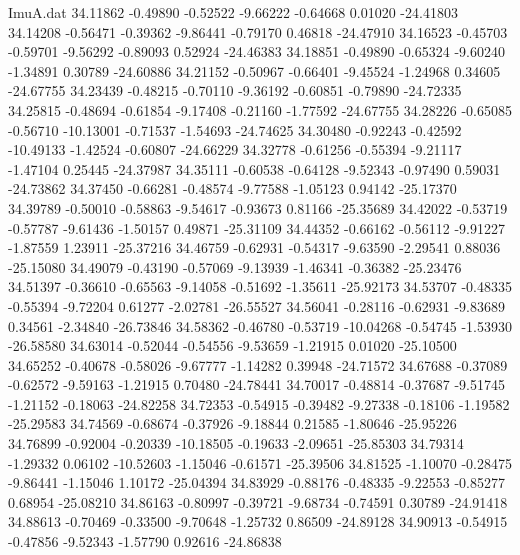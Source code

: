 \begin{filecontents}{ImuA.dat}
  34.11862   -0.49890   -0.52522   -9.66222   -0.64668    0.01020  -24.41803
  34.14208   -0.56471   -0.39362   -9.86441   -0.79170    0.46818  -24.47910
  34.16523   -0.45703   -0.59701   -9.56292   -0.89093    0.52924  -24.46383
  34.18851   -0.49890   -0.65324   -9.60240   -1.34891    0.30789  -24.60886
  34.21152   -0.50967   -0.66401   -9.45524   -1.24968    0.34605  -24.67755
  34.23439   -0.48215   -0.70110   -9.36192   -0.60851   -0.79890  -24.72335
  34.25815   -0.48694   -0.61854   -9.17408   -0.21160   -1.77592  -24.67755
  34.28226   -0.65085   -0.56710  -10.13001   -0.71537   -1.54693  -24.74625
  34.30480   -0.92243   -0.42592  -10.49133   -1.42524   -0.60807  -24.66229
  34.32778   -0.61256   -0.55394   -9.21117   -1.47104    0.25445  -24.37987
  34.35111   -0.60538   -0.64128   -9.52343   -0.97490    0.59031  -24.73862
  34.37450   -0.66281   -0.48574   -9.77588   -1.05123    0.94142  -25.17370
  34.39789   -0.50010   -0.58863   -9.54617   -0.93673    0.81166  -25.35689
  34.42022   -0.53719   -0.57787   -9.61436   -1.50157    0.49871  -25.31109
  34.44352   -0.66162   -0.56112   -9.91227   -1.87559    1.23911  -25.37216
  34.46759   -0.62931   -0.54317   -9.63590   -2.29541    0.88036  -25.15080
  34.49079   -0.43190   -0.57069   -9.13939   -1.46341   -0.36382  -25.23476
  34.51397   -0.36610   -0.65563   -9.14058   -0.51692   -1.35611  -25.92173
  34.53707   -0.48335   -0.55394   -9.72204    0.61277   -2.02781  -26.55527
  34.56041   -0.28116   -0.62931   -9.83689    0.34561   -2.34840  -26.73846
  34.58362   -0.46780   -0.53719  -10.04268   -0.54745   -1.53930  -26.58580
  34.63014   -0.52044   -0.54556   -9.53659   -1.21915    0.01020  -25.10500
  34.65252   -0.40678   -0.58026   -9.67777   -1.14282    0.39948  -24.71572
  34.67688   -0.37089   -0.62572   -9.59163   -1.21915    0.70480  -24.78441
  34.70017   -0.48814   -0.37687   -9.51745   -1.21152   -0.18063  -24.82258
  34.72353   -0.54915   -0.39482   -9.27338   -0.18106   -1.19582  -25.29583
  34.74569   -0.68674   -0.37926   -9.18844    0.21585   -1.80646  -25.95226
  34.76899   -0.92004   -0.20339  -10.18505   -0.19633   -2.09651  -25.85303
  34.79314   -1.29332    0.06102  -10.52603   -1.15046   -0.61571  -25.39506
  34.81525   -1.10070   -0.28475   -9.86441   -1.15046    1.10172  -25.04394
  34.83929   -0.88176   -0.48335   -9.22553   -0.85277    0.68954  -25.08210
  34.86163   -0.80997   -0.39721   -9.68734   -0.74591    0.30789  -24.91418
  34.88613   -0.70469   -0.33500   -9.70648   -1.25732    0.86509  -24.89128
  34.90913   -0.54915   -0.47856   -9.52343   -1.57790    0.92616  -24.86838

\end{filecontents}
